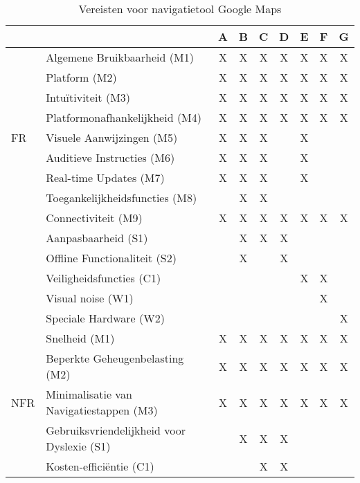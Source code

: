 \begin{table}[ht]
    \centering
    \caption{Vereisten voor navigatietool Google Maps}
    \label{tab:google_maps_requirements}
    \begin{tabular}{|l|l|c|c|c|c|c|c|c|}
        \hline
        & \textbf{} & \textbf{A} & \textbf{B} & \textbf{C} & \textbf{D} & \textbf{E} & \textbf{F} & \textbf{G} \\ \hline
        \multirow{9}{*}{FR} & Algemene Bruikbaarheid (M1) & X & X & X & X & X & X & X \\ \cline{2-9}
        & Platform (M2) & X & X & X & X & X & X & X \\ \cline{2-9}
        & Intuïtiviteit (M3) & X & X & X & X & X & X & X \\ \cline{2-9}
        & Platformonafhankelijkheid (M4) & X & X & X & X & X & X & X \\ \cline{2-9}
        & Visuele Aanwijzingen (M5) & X & X & X &  & X &  &  \\ \cline{2-9}
        & Auditieve Instructies (M6) & X & X & X &  & X &  &  \\ \cline{2-9}
        & Real-time Updates (M7) & X & X & X &  & X &  &  \\ \cline{2-9}
        & Toegankelijkheidsfuncties (M8) &  & X & X &  &  &  &  \\ \cline{2-9}
        & Connectiviteit (M9) & X & X & X & X & X & X & X \\ \cline{2-9}
        & Aanpasbaarheid (S1) &  & X & X & X &  &  &  \\ \cline{2-9}
        & Offline Functionaliteit (S2) &  & X &  & X &  &  &  \\ \cline{2-9}
        & Veiligheidsfuncties (C1) &  &  &  &  & X & X &  \\ \cline{2-9}
        & Visual noise (W1) &  &  &  &  &  & X &  \\ \cline{2-9}
        & Speciale Hardware (W2) &  &  &  &  &  &  & X \\ \hline
        \multirow{5}{*}{NFR} & Snelheid (M1) & X & X & X & X & X & X & X \\ \cline{2-9}
        & Beperkte Geheugenbelasting (M2) & X & X & X & X & X & X & X \\ \cline{2-9}
        & Minimalisatie van Navigatiestappen (M3) & X & X & X & X & X & X & X \\ \cline{2-9}
        & Gebruiksvriendelijkheid voor Dyslexie (S1) &  & X & X & X &  &  &  \\ \cline{2-9}
        & Kosten-efficiëntie (C1) &  &  & X & X &  &  &  \\ \hline
    \end{tabular}
    \end{table}
